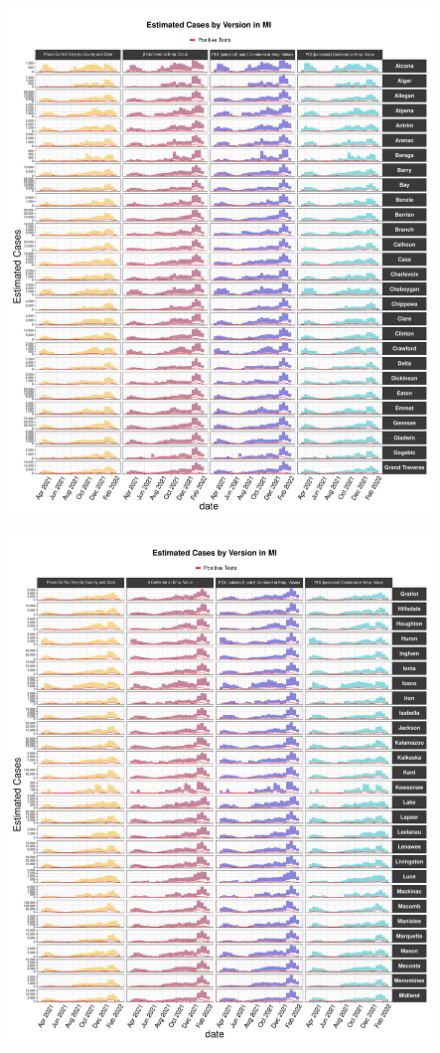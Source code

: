\documentclass[12pt,twoside]{smiththesis}
\begin{document}
\begin{figure}
\includegraphics[width=1\linewidth]{figure/mi1_pb_compared_to_observed} \caption{\label{fig:pb_versions_mi}}\label{fig:unnamed-chunk-4-1}
\end{figure}
\begin{figure}
\includegraphics[width=1\linewidth]{figure/mi2_pb_compared_to_observed} \caption{\label{fig:pb_versions_mi}}\label{fig:unnamed-chunk-4-2}
\end{figure}
\end{document}
